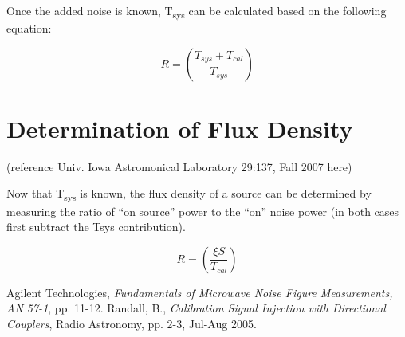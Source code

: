 \documentclass[letterpaper, 12pt]{article}
\begin{document}
Once the added noise is known, T\textsubscript{sys} can be calculated based on the following equation:

\begin{equation}
R = (\frac{T_{sys} + T_{cal}}{T_{sys}})
\end{equation}

\section{Determination of Flux Density}
{\color{red}(reference Univ. Iowa Astromonical Laboratory 29:137, Fall 2007 here)}

Now that T\textsubscript{sys} is known, the flux density of a source can be determined by measuring the ratio of “on source” power to the “on” noise power (in both cases first subtract the Tsys contribution).

\begin{equation}
R = (\frac{\xi S}{T_{cal}})
\end{equation}

\newpage	%
\begin{thebibliography}{10} %
 Agilent Technologies, \emph{Fundamentals of Microwave Noise Figure Measurements, AN 57-1}, pp. 11-12.
 Randall, B., \emph{Calibration Signal Injection with Directional Couplers}, 
Radio Astronomy, pp. 2-3, Jul-Aug 2005.
\end{thebibliography}
\end{document}
